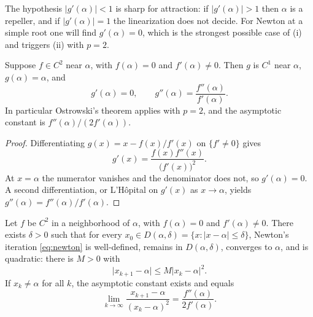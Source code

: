 The hypothesis \(\lvert g'(\alpha)\rvert<1\) is sharp for attraction: if \(\lvert g'(\alpha)\rvert>1\) then \(\alpha\) is a repeller, and if \(\lvert g'(\alpha)\rvert=1\) the linearization does not decide. For Newton at a simple root one will find \(g'(\alpha)=0\), which is the strongest possible case of (i) and triggers (ii) with \(p=2\).

\begin{lemma}
\label{lem:g-simple}
Suppose \(f\in C^2\) near \(\alpha\), with \(f(\alpha)=0\) and \(f'(\alpha)\neq 0\). Then \(g\) is \(C^1\) near \(\alpha\), \(g(\alpha)=\alpha\), and
\[
g'(\alpha)
=
0,
\qquad
g''(\alpha)
=
\frac{f''(\alpha)}{f'(\alpha)}.
\]
In particular Ostrowski's theorem applies with \(p=2\), and the asymptotic constant is \(f''(\alpha)/(2f'(\alpha))\).
\end{lemma}

\begin{proof}
Differentiating \(g(x)=x-f(x)/f'(x)\) on \(\{f'\neq 0\}\) gives
\[
g'(x)
=
\frac{f(x)f''(x)}{\bigl(f'(x)\bigr)^2}.
\]
At \(x=\alpha\) the numerator vanishes and the denominator does not, so \(g'(\alpha)=0\). A second differentiation, or L'H\^{o}pital on \(g'(x)\) as \(x\to\alpha\), yields \(g''(\alpha)=f''(\alpha)/f'(\alpha)\).
\end{proof}

\begin{theorem}
\label{thm:newton-simple}
Let \(f\) be \(C^2\) in a neighborhood of \(\alpha\), with \(f(\alpha)=0\) and \(f'(\alpha)\neq 0\). There exists \(\delta>0\) such that for every \(x_0\in D(\alpha,\delta)=\{x:\lvert x-\alpha\rvert\le\delta\}\), Newton's iteration \eqref{eq:newton} is well-defined, remains in \(D(\alpha,\delta)\), converges to \(\alpha\), and is quadratic: there is \(M>0\) with
\[
\bigl\lvert x_{k+1}-\alpha\bigr\rvert
\le
M\bigl\lvert x_k-\alpha\bigr\rvert^2.
\]
If \(x_k\neq\alpha\) for all \(k\), the asymptotic constant exists and equals
\begin{equation}
\label{eq:newton-const}
\lim_{k\to\infty}
\frac{x_{k+1}-\alpha}{(x_k-\alpha)^2}
=
\frac{f''(\alpha)}{2f'(\alpha)}.
\end{equation}
\end{theorem}

